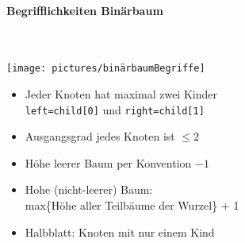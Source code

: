 \documentclass[
    ngerman,
    color=3b,
    load_common, %
    summary,
    boxarc,
]{tuda_summary}
\begin{document}
\paragraph{Begrifflichkeiten Binärbaum}\mbox{}\\
\begin{minipage}[c]{0.45\textwidth}\mbox{}
    \texttt{[image: pictures/binärbaumBegriffe]}
\end{minipage}
\begin{minipage}[c]{0.45\textwidth}\mbox{}
    \begin{itemize}
        \item Jeder Knoten hat maximal zwei Kinder \\
              \texttt{left=child[0]} und \texttt{right=child[1]}
        \item Ausgangsgrad jedes Knoten ist $\leq 2$
        \item Höhe leerer Baum per Konvention $-1$
        \item Hohe (nicht-leerer) Baum: \\
              max\{Höhe aller Teilbäume der Wurzel\} + 1
        \item Halbblatt: Knoten mit nur einem Kind
    \end{itemize}
\end{minipage}
\end{document}
